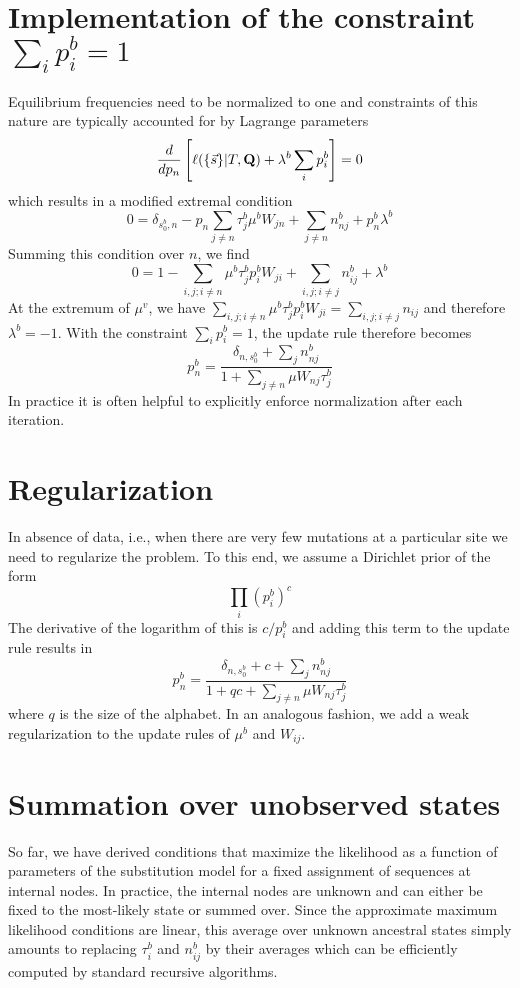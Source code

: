 \documentclass[aps,rmp,onecolumn]{revtex4}
\newcommand{\mat}[1]{{\bf #1}}
\newcommand{\eqp}{p}
\newcommand{\lh}{\ell}
\begin{document}
\section*{Implementation of the constraint $\sum_i \eqp_i^b=1$}
Equilibrium frequencies need to be normalized to one and constraints of this nature are typically accounted for by Lagrange parameters
\begin{equation}
	\frac{d}{d \eqp_n} \left[\lh (\{\vec{s}\} |T, \mat{Q}) + \lambda^b \sum_i \eqp^b_i \right] = 0
\end{equation}
which results in a modified extremal condition
\begin{equation}
	0 = \delta_{s^b_0,n}-\eqp_{n}\sum_{j\neq n} \tau^b_j \mu^b W_{j n} + \sum_{j\neq n} n^b_{nj} + \eqp^b_{n}\lambda^b
\end{equation}
Summing this condition over $n$, we find
\begin{equation}
	0 = 1 - \sum_{i,j; i \neq n}  \mu^b \tau^b_j \eqp^b_{i}W_{j i} + \sum_{i,j; i\neq j} n^b_{ij} + \lambda^b
\end{equation}
At the extremum of $\mu^v$, we have $\sum_{i,j; i \neq n} \mu^b \tau^b_j \eqp^b_{i}W_{j i} = \sum_{i,j; i\neq j} n_{ij}$ and therefore $\lambda^b=-1$.
With the constraint $\sum_i \eqp_i^b=1$, the update rule therefore becomes
\begin{equation}
	\eqp^b_n = \frac{\delta_{n,s^b_0}+\sum_j n^b_{nj}}{1 + \sum_{j\neq n} \mu W_{nj}\tau^b_j}
\end{equation}
In practice it is often helpful to explicitly enforce normalization after each iteration.

\section*{Regularization}
In absence of data, i.e., when there are very few mutations at a particular site we need to regularize the problem.
To this end, we assume a Dirichlet prior of the form
\begin{equation}
\prod_i \left(\eqp^b_i\right)^c
\end{equation}
The derivative of the logarithm of this is $c/\eqp^b_i$ and adding this term to the update rule results in
\begin{equation}
	\eqp^b_n = \frac{\delta_{n,s^b_0} + c +\sum_j n^b_{nj}}{1 + qc + \sum_{j\neq n} \mu W_{nj}\tau^b_j}
\end{equation}
where $q$ is the size of the alphabet.
In an analogous fashion, we add a weak regularization to the update rules of $\mu^b$ and $W_{ij}$.

\section*{Summation over unobserved states}
So far, we have derived conditions that maximize the likelihood as a function of parameters of the substitution model for a fixed assignment of sequences at internal nodes.
In practice, the internal nodes are unknown and can either be fixed to the most-likely state or summed over.
Since the approximate maximum likelihood conditions are linear, this average over unknown ancestral states simply amounts to replacing $\tau^b_i$ and $n^b_{ij}$ by their averages which can be efficiently computed by standard recursive algorithms.
\end{document}
